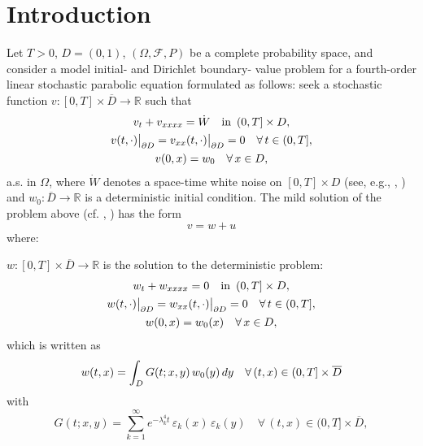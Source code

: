 \documentclass[10pt]{amsart}
\numberwithin{equation}{section}
\begin{document}
\section{Introduction}\label{SECT1}
Let $T>0$, $D=(0,1)$, $(\Omega,{\mathcal F},P)$ be a complete
probability space, and consider a model initial- and Dirichlet
boundary- value problem for a fourth-order linear stochastic
parabolic equation formulated as follows:
seek a stochastic function $v:[0,T]\times{\overline D}\to{{\mathbb R}}$
such that
\begin{equation}\label{PARAP}
\begin{gathered}
v_t +v_{xxxx}={\dot W}\quad\text{\rm in}
\,\,\,(0,T]\times D,\\
v(t,\cdot)\big|_{{\scriptscriptstyle}\partial D}
=v_{xx}(t,\cdot)\big|_{{\scriptscriptstyle}\partial D}=0\quad\forall\,t\in(0,T],\\
v(0,x)=w_0\quad\forall\,x\in D,\\
\end{gathered}
\end{equation}
a.s. in $\Omega$, where ${\dot W}$ denotes a space-time
white noise on $[0,T]\times D$ (see, e.g., \cite{Walsh86},
\cite{KXiong}) and $w_0:{\overline D}\rightarrow{\mathbb R}$ is a
deterministic initial condition.
The mild solution of the problem above (cf. \cite{Carolina1},
\cite{DapDeb1}) has the form
\begin{equation*}
v=w+u
\end{equation*}
where:
\par\textbullet\quad $w:[0,T]\times{\overline D}\rightarrow{\mathbb R}$ is the solution
to the deterministic problem:
\begin{equation}\label{Det_Parab}
\begin{gathered}
w_t +w_{xxxx} = 0
\quad\text{\rm in}
\,\,\,(0,T]\times D,\\
w(t,\cdot)\big|_{{\scriptscriptstyle}\partial D}
=w_{xx}(t,\cdot)\big|_{{\scriptscriptstyle}\partial D}=0
\quad\forall\,t\in(0,T],\\
w(0,x)=w_0(x)\quad\forall\,x\in D,\\
\end{gathered}
\end{equation}
which is written as
\begin{equation}\label{deter_green}
w(t,x)=\int_{{\scriptscriptstyle} D}G(t;x,y)\,w_0(y)\,dy
\quad \forall\,(t,x)\in(0,T]\times{\overline D}
\end{equation}
with 
\begin{equation}\label{GreenKernel}
G(t;x,y)=\sum_{k=1}^{\infty}e^{-\lambda_k^4 t}
\,\varepsilon_k(x)\,\varepsilon_k(y)
\quad \forall\,(t,x)\in(0,T]\times{\overline D},
\end{equation}
\end{document}
